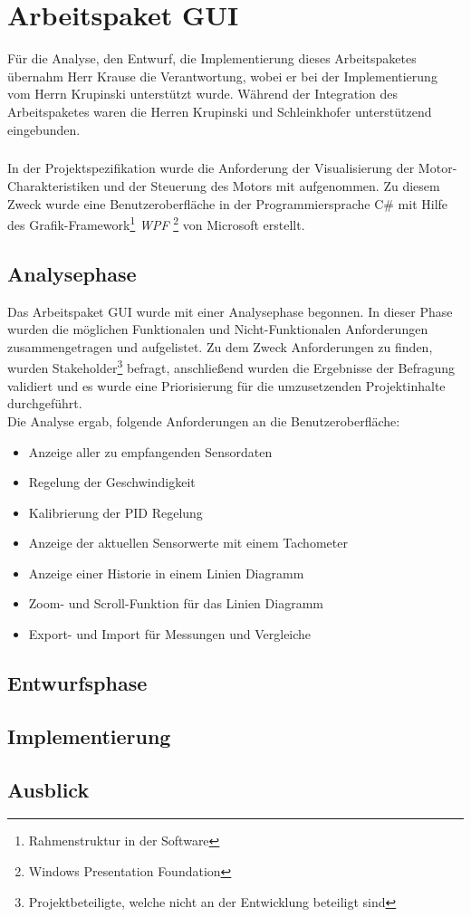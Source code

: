 \graphicspath{{./gui/Bilder/}}

\chapter{Arbeitspaket GUI}
Für die Analyse, den Entwurf, die Implementierung dieses Arbeitspaketes übernahm Herr Krause die Verantwortung, wobei er bei der Implementierung vom Herrn Krupinski unterstützt wurde. Während der Integration des Arbeitspaketes waren die Herren Krupinski und Schleinkhofer unterstützend eingebunden.
\paragraph{}
In der Projektspezifikation wurde die Anforderung der Visualisierung der Motor-Charakteristiken und der Steuerung des Motors mit aufgenommen. Zu diesem Zweck wurde eine Benutzeroberfläche in der Programmiersprache C\# mit Hilfe des Grafik-Framework\footnote{Rahmenstruktur in der Software} \textit{WPF} \footnote{Windows Presentation Foundation} von Microsoft erstellt.

\section{Analysephase}
Das Arbeitspaket GUI wurde mit einer Analysephase begonnen. In dieser Phase wurden die möglichen Funktionalen und Nicht-Funktionalen Anforderungen zusammengetragen und aufgelistet. Zu dem Zweck Anforderungen zu finden, wurden Stakeholder\footnote{Projektbeteiligte, welche nicht an der Entwicklung beteiligt sind} befragt, anschließend wurden die Ergebnisse der Befragung validiert und es wurde eine Priorisierung für die umzusetzenden Projektinhalte durchgeführt.\\
Die Analyse ergab, folgende Anforderungen an die Benutzeroberfläche:

\begin{itemize}
	\item Anzeige aller zu empfangenden Sensordaten
	\item Regelung der Geschwindigkeit
	\item Kalibrierung der PID Regelung
	\item Anzeige der aktuellen Sensorwerte mit einem Tachometer
	\item Anzeige einer Historie in einem Linien Diagramm
	\item Zoom- und Scroll-Funktion für das Linien Diagramm
	\item Export- und Import für Messungen und Vergleiche
\end{itemize} 

\section{Entwurfsphase}

\section{Implementierung}
 
\section{Ausblick}





